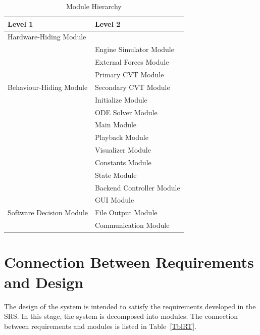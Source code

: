 \documentclass[12pt, titlepage]{article}
\begin{document}
\begin{table}[h!]
\centering
\begin{tabular}{p{} p{}}
\toprule
\textbf{Level 1} & \textbf{Level 2}\\
\midrule

{Hardware-Hiding Module} & ~ \\
\midrule

\multirow{7}{0.3\textwidth}{Behaviour-Hiding Module}
& Engine Simulator Module\\
& External Forces Module\\
& Primary CVT Module\\
& Secondary CVT Module\\
& Initialize Module\\
& ODE Solver Module\\
& Main Module\\ 
& Playback Module\\
& Visualizer Module\\
& Constants Module\\
& State Module\\
& Backend Controller Module\\
\midrule

\multirow{3}{0.3\textwidth}{Software Decision Module}
& GUI Module\\
& File Output Module\\
& Communication Module\\
\bottomrule

\end{tabular}
\caption{Module Hierarchy}
\label{TblMH}
\end{table}

\section{Connection Between Requirements and Design} \label{SecConnection}

The design of the system is intended to satisfy the requirements developed in
the SRS. In this stage, the system is decomposed into modules. The connection
between requirements and modules is listed in Table~\ref{TblRT}.

\end{document}
